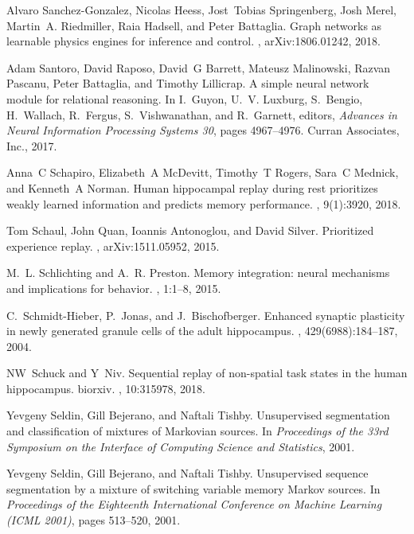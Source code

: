 \documentclass[letterpaper,11pt]{article}
\begin{document}
\begin{thebibliography}{100}
Alvaro Sanchez{-}Gonzalez, Nicolas Heess, Jost~Tobias Springenberg, Josh Merel,
  Martin~A. Riedmiller, Raia Hadsell, and Peter Battaglia.
\newblock Graph networks as learnable physics engines for inference and
  control.
, arXiv:1806.01242, 2018.

Adam Santoro, David Raposo, David~G Barrett, Mateusz Malinowski, Razvan
  Pascanu, Peter Battaglia, and Timothy Lillicrap.
\newblock A simple neural network module for relational reasoning.
\newblock In I.~Guyon, U.~V. Luxburg, S.~Bengio, H.~Wallach, R.~Fergus,
  S.~Vishwanathan, and R.~Garnett, editors, {\em Advances in Neural Information
  Processing Systems 30}, pages 4967--4976. Curran Associates, Inc., 2017.

Anna~C Schapiro, Elizabeth~A McDevitt, Timothy~T Rogers, Sara~C Mednick, and
  Kenneth~A Norman.
\newblock Human hippocampal replay during rest prioritizes weakly learned
  information and predicts memory performance.
, 9(1):3920, 2018.

Tom Schaul, John Quan, Ioannis Antonoglou, and David Silver.
\newblock Prioritized experience replay.
, arXiv:1511.05952, 2015.

M.~L. Schlichting and A.~R. Preston.
\newblock Memory integration: neural mechanisms and implications for behavior.
, 1:1--8, 2015.

C.~Schmidt-Hieber, P.~Jonas, and J.~Bischofberger.
\newblock Enhanced synaptic plasticity in newly generated granule cells of the
  adult hippocampus.
, 429(6988):184--187, 2004.

NW~Schuck and Y~Niv.
\newblock Sequential replay of non-spatial task states in the human
  hippocampus. biorxiv.
, 10:315978, 2018.

Yevgeny Seldin, Gill Bejerano, and Naftali Tishby.
\newblock Unsupervised segmentation and classification of mixtures of
  {M}arkovian sources.
\newblock In {\em Proceedings of the 33rd Symposium on the Interface of
  Computing Science and Statistics}, 2001.

Yevgeny Seldin, Gill Bejerano, and Naftali Tishby.
\newblock Unsupervised sequence segmentation by a mixture of switching variable
  memory {M}arkov sources.
\newblock In {\em Proceedings of the Eighteenth International Conference on
  Machine Learning (ICML 2001)}, pages 513--520, 2001.


\end{thebibliography}
\end{document}
